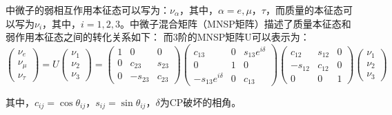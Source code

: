 \documentclass[10pt,a4paper]{article}
\begin{document}
中微子的弱相互作用本征态可以写为：$\nu_{\alpha}$，其中，$\alpha=e,\mu，\tau$，而质量的本征态可以写为$\nu_{i}$，其中，$i=1,2,3$。中微子混合矩阵（MNSP矩阵）描述了质量本征态和弱作用本征态之间的转化关系如下：
而3阶的MNSP矩阵U可以表示为：
\begin{equation}
\begin{pmatrix}
 \nu_e  \\
 \nu_{\mu}  \\
 \nu_{\tau}
 \end{pmatrix}
 =U \begin{pmatrix}
 \nu_1  \\
 \nu_2  \\
 \nu_3
 \end{pmatrix}
 = \begin{pmatrix}
 1 & 0 & 0 \\
 0 & c_{23} & s_{23} \\
 0 & -s_{23} & c_{23}
 \end{pmatrix}
 \begin{pmatrix}
 c_{13} & 0 & s_{13}e^{i\delta} \\
 0 & 1 & 0 \\
 -s_{13}e^{i\delta} & 0 & c_{13}
 \end{pmatrix} 
 \begin{pmatrix}
 c_{12} & s_{12} & 0 \\
 -s_{12} & c_{12} & 0 \\
 0 & 0 & 1
 \end{pmatrix}
 \begin{pmatrix}
 \nu_1  \\
 \nu_2  \\
 \nu_3
 \end{pmatrix}
\end{equation}

其中，$c_{ij}=\cos{\theta_{ij}}$，$s_{ij}=\sin{\theta_{ij}}$，$\delta$为CP破坏的相角。
\end{document}
